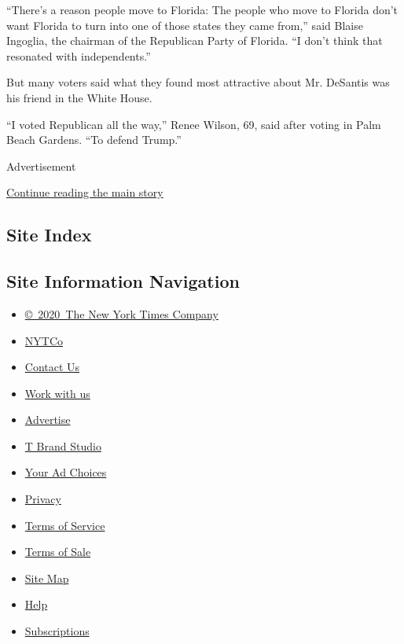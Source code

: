 ``There's a reason people move to Florida: The people who move to
Florida don't want Florida to turn into one of those states they came
from,'' said Blaise Ingoglia, the chairman of the Republican Party of
Florida. ``I don't think that resonated with independents.''

But many voters said what they found most attractive about Mr. DeSantis
was his friend in the White House.

``I voted Republican all the way,'' Renee Wilson, 69, said after voting
in Palm Beach Gardens. ``To defend Trump.''

Advertisement

\protect\hyperlink{after-bottom}{Continue reading the main story}

\hypertarget{site-index}{%
\subsection{Site Index}\label{site-index}}

\hypertarget{site-information-navigation}{%
\subsection{Site Information
Navigation}\label{site-information-navigation}}

\begin{itemize}
\tightlist
\item
  \href{https://help.nytimes.com/hc/en-us/articles/115014792127-Copyright-notice}{©~2020~The
  New York Times Company}
\end{itemize}

\begin{itemize}
\tightlist
\item
  \href{https://www.nytco.com/}{NYTCo}
\item
  \href{https://help.nytimes.com/hc/en-us/articles/115015385887-Contact-Us}{Contact
  Us}
\item
  \href{https://www.nytco.com/careers/}{Work with us}
\item
  \href{https://nytmediakit.com/}{Advertise}
\item
  \href{http://www.tbrandstudio.com/}{T Brand Studio}
\item
  \href{https://www.nytimes.com/privacy/cookie-policy\#how-do-i-manage-trackers}{Your
  Ad Choices}
\item
  \href{https://www.nytimes.com/privacy}{Privacy}
\item
  \href{https://help.nytimes.com/hc/en-us/articles/115014893428-Terms-of-service}{Terms
  of Service}
\item
  \href{https://help.nytimes.com/hc/en-us/articles/115014893968-Terms-of-sale}{Terms
  of Sale}
\item
  \href{https://spiderbites.nytimes.com}{Site Map}
\item
  \href{https://help.nytimes.com/hc/en-us}{Help}
\item
  \href{https://www.nytimes.com/subscription?campaignId=37WXW}{Subscriptions}
\end{itemize}
